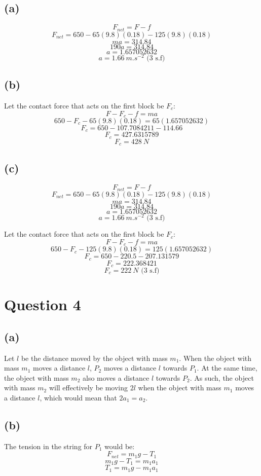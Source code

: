 \documentclass[11pt]{article}
\begin{document}
\subsection{(a)}
\label{sec:orgf561d8f}
\[F_{net} = F - f\]
\[F_{net} = 650 - 65(9.8)(0.18) - 125(9.8)(0.18)\]
\[ma = 314.84\]
\[190a = 314.84\]
\[a = 1.657052632\]
\[a = \qty{1.66}{\unit{m.s^{-2}}} \text{ (3 s.f)}\]

\subsection{(b)}
\label{sec:org0da37d7}
Let the contact force that acts on the first block be \(F_c\):
\[F - F_c - f = ma\]
\[650 - F_c - 65(9.8)(0.18) = 65(1.657052632)\]
\[F_c = 650 - 107.7084211 - 114.66\]
\[F_c = 427.6315789\]
\[F_c = \qty{428}{\unit{N}}\]

\subsection{(c)}
\label{sec:org4cd32b4}
\[F_{net} = F - f\]
\[F_{net} = 650 - 65(9.8)(0.18) - 125(9.8)(0.18)\]
\[ma = 314.84\]
\[190a = 314.84\]
\[a = 1.657052632\]
\[a = \qty{1.66}{\unit{m.s^{-2}}} \text{ (3 s.f)}\]

Let the contact force that acts on the first block be \(F_c\):
\[F - F_c - f = ma\]
\[650 - F_c - 125(9.8)(0.18) = 125(1.657052632)\]
\[F_c = 650 - 220.5 - 207.131579\]
\[F_c = 222.368421\]
\[F_c = \qty{222}{\unit{N}} \text{ (3 s.f)}\]


\section{Question 4}
\label{sec:orgf2308fb}

\subsection{(a)}
\label{sec:orgca0ba56}
Let \(l\) be the distance moved by the object with mass \(m_1\). When the object with mass \(m_1\) moves a distance \(l\), \(P_2\) moves a distance \(l\) towards \(P_1\). At the same time, the object with mass \(m_2\) also moves a distance \(l\) towards \(P_2\). As such, the object with mass \(m_2\) will effectively be moving \(2l\) when the object with mass \(m_1\) moves a distance \(l\), which would mean that \(2a_1 = a_2\).

\subsection{(b)}
\label{sec:orga576ac8}
The tension in the string for \(P_1\) would be:
\[F_{net} = m_1 g - T_1\]
\[m_1 g - T_1 = m_1 a_1\]
\[T_1 = m_1 g - m_1 a_1\]
\end{document}

